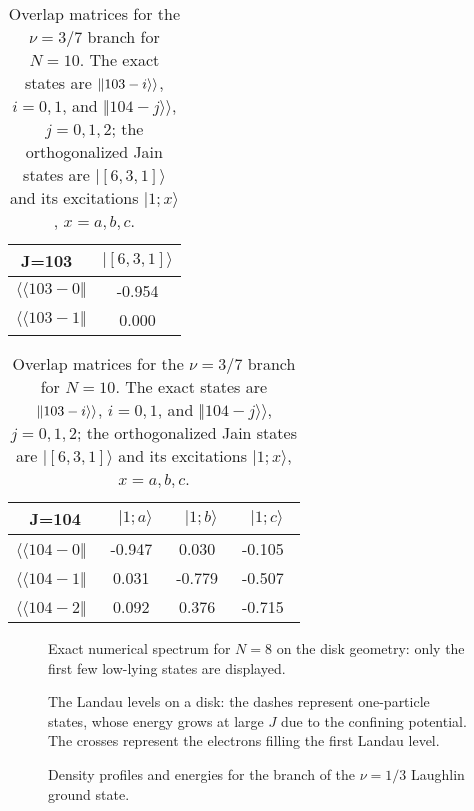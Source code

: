 \begin{table}
\caption{Overlap matrices for the $\nu=3/7$ branch for $N=10$.
The exact states are $\Vert 103-i \rangle\rangle$, $i=0,1$, and 
$\Vert 104-j \rangle\rangle$, $j=0,1,2$; 
the orthogonalized Jain states are
$\vert [6,3,1] \rangle$ and its excitations
$\vert 1; x\rangle$, $x=a,b,c$.} 
\label{tab7}
\vspace{0.4cm}
\begin{center}
\begin{tabular}{|c|c|} 
\hline
J=103\ & $\vert [6,3,1] \rangle$  \\ 
\hline
$\langle\langle 103- 0\Vert$ & -0.954 \\ 
$\langle\langle 103- 1\Vert$ &  0.000 \\ 
\end{tabular}
\begin{tabular}{|c|c|c|c|} 
J=104 & $\vert 1;a\rangle$ & $\vert 1;b\rangle$ & $\vert 1;c\rangle$  \\ 
\hline
$\langle\langle 104-0\Vert$\ & -0.947\ & 0.030\ & -0.105\ \\
$\langle\langle 104-1\Vert$\ &  0.031\ &-0.779\ & -0.507\ \\
$\langle\langle 104-2\Vert$\ &  0.092\ & 0.376\ & -0.715\ \\
\hline
\end{tabular}
\end{center}
\end{table}




\begin{figure}
\epsfxsize=14cm \centerline{}
\caption{Exact numerical spectrum for $N=8$ on the disk geometry:
only the first few low-lying states are displayed.}
\label{fig1}
\end{figure}

\begin{figure}
\epsfxsize=14cm  
\caption{The Landau levels on a disk:
the dashes represent one-particle states, whose energy grows
at large $J$ due to the confining potential.
The crosses represent the electrons filling the first Landau level.}
\label{fig2}
\end{figure}

\begin{figure}
\epsfxsize=14cm \centerline{}
\caption{Density profiles and energies for the branch of the $\nu=1/3$ 
Laughlin ground state.}
\label{fig3}
\end{figure}

